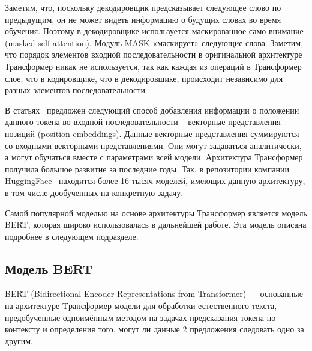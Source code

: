  Заметим, что, поскольку декодировщик предсказывает следующее слово по предыдущим, он не может видеть информацию о будущих словах во время обучения. Поэтому в декодировщике используется маскированное само-внимание (masked self-attention). Модуль MASK «маскирует» следующие слова.
Заметим, что порядок элементов входной последовательности в оригинальной архитектуре Трансформер никак не используется, так как каждая из операций в Трансформер слое, что в кодировщике, что в декодировщике, происходит независимо для разных элементов последовательности. 

В статьях~\cite{devlin_2018,gehring_2017,vaswani_2017} предложен следующий способ добавления информации о положении данного токена во входной последовательности -- векторные представления позиций (position embeddings). Данные векторные представления суммируются со входными векторными представлениями. Они могут задаваться аналитически, а могут обучаться вместе с параметрами всей модели.
Архитектура Трансформер получила большое развитие за последние годы. Так, в репозитории компании HuggingFace~\cite{na_website_ndaa} находится более 16 тысяч моделей, имеющих данную архитектуру, в том числе дообученных на конкретную задачу. 

Самой популярной моделью на основе архитектуры Трансформер является модель BERT, которая широко использовалась в дальнейшей работе. Эта модель описана подробнее в следующем подразделе. 

\subsection{Модель BERT}

BERT (Bidirectional Encoder Representations from Transformer)~\cite{devlin_2018} -- основанные на архитектуре Tрансформер модели для обработки естественного текста, предобученные одноимённым методом на задачах предсказания токена по контексту и определения того, могут ли данные 2 предложения следовать одно за другим. 

